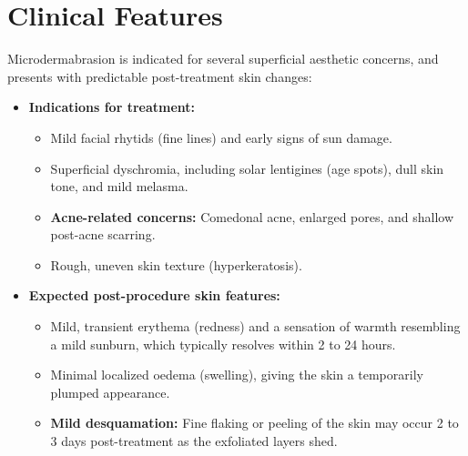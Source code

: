\section*{Clinical Features}
Microdermabrasion is indicated for several superficial aesthetic concerns, and presents with predictable post-treatment skin changes:
\begin{itemize}
    \item \textbf{Indications for treatment:}
        \begin{itemize}
            \item Mild facial rhytids (fine lines) and early signs of sun damage.
            \item Superficial dyschromia, including solar lentigines (age spots), dull skin tone, and mild melasma.
            \item \textbf{Acne-related concerns:} Comedonal acne, enlarged pores, and shallow post-acne scarring.
            \item Rough, uneven skin texture (hyperkeratosis).
        \end{itemize}
    \item \textbf{Expected post-procedure skin features:}
        \begin{itemize}
            \item Mild, transient erythema (redness) and a sensation of warmth resembling a mild sunburn, which typically resolves within 2 to 24 hours.
            \item Minimal localized oedema (swelling), giving the skin a temporarily plumped appearance.
            \item \textbf{Mild desquamation:} Fine flaking or peeling of the skin may occur 2 to 3 days post-treatment as the exfoliated layers shed.
        \end{itemize}
\end{itemize}


